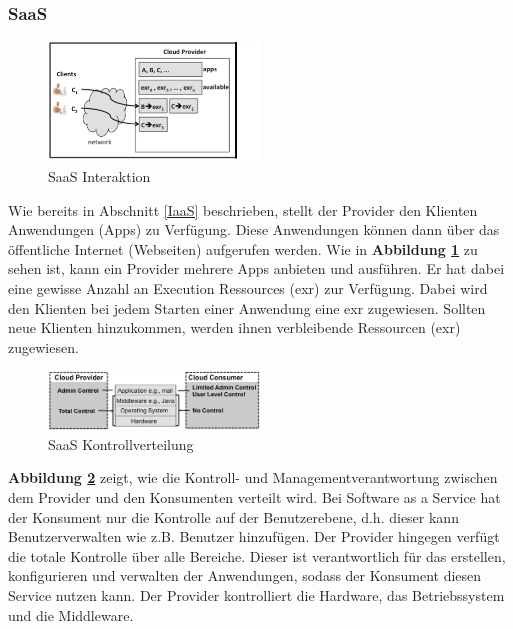 \subsubsection{SaaS}\label{SaaS Architektur}

\begin{figure}[H]
    \centering
	\includegraphics[width=0.5\textwidth]{Images/SaaSInteraction}
	\caption{SaaS Interaktion \cite{Badger}}
	\label{SaaSInteraction}
\end{figure}
Wie bereits in Abschnitt \ref{IaaS} beschrieben, stellt der Provider den Klienten Anwendungen (\glqq Apps\grqq{}{}) zu Verfügung.
Diese Anwendungen können dann über das öffentliche Internet (Webseiten) aufgerufen werden.
Wie in \textbf{Abbildung \ref{SaaSInteraction}} zu sehen ist, kann ein Provider mehrere Apps anbieten und ausführen.
Er hat dabei eine gewisse Anzahl an \glqq Execution Ressources\grqq{}{} (exr) zur Verfügung. 
Dabei wird den Klienten bei jedem Starten einer Anwendung eine exr zugewiesen. Sollten neue Klienten hinzukommen, werden ihnen verbleibende Ressourcen (exr) zugewiesen. 

\begin{figure}[H]
    \centering
	\includegraphics[width=0.5\textwidth]{Images/SaaSControl}
	\caption{SaaS Kontrollverteilung \cite{Badger}}
	\label{SaaSControl}
\end{figure}
\textbf{Abbildung \ref{SaaSControl}} zeigt, wie die Kontroll- und Managementverantwortung zwischen dem Provider und den Konsumenten verteilt wird.
Bei Software as a Service hat der Konsument nur die Kontrolle auf der Benutzerebene, d.h. dieser kann Benutzerverwalten wie z.B. Benutzer hinzufügen.
Der Provider hingegen verfügt die totale Kontrolle über alle Bereiche. Dieser ist verantwortlich für das erstellen, konfigurieren und verwalten der Anwendungen, 
sodass der Konsument diesen Service nutzen kann.
Der Provider kontrolliert die Hardware, das Betriebssystem und die Middleware\cite{Badger}.

